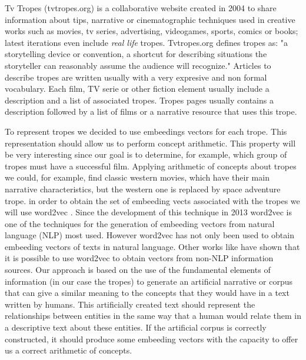 \documentclass[letterpaper]{article}
\begin{document}
Tv Tropes (tvtropes.org) is a collaborative website created in 2004 to
share information about tips, narrative or cinematographic techniques
used in creative works such as movies, tv series, advertising,
videogames, sports, comics or books; latest iterations even include
{\em real life} tropes.
Tvtropes.org defines tropes as:
"a storytelling device or convention, a shortcut for describing
situations the storyteller can reasonably assume the audience will
recognize." Articles to describe tropes are written usually with a very
expresive and non formal vocabulary. Each film, TV serie or other
fiction element usually include a description and a list of associated
tropes. Tropes pages usually contains a description followed by a list
of films or a narrative resource that uses this trope.

To represent tropes we decided to use embeedings vectors for each
trope. This representation should allow us to perform concept
arithmetic. This property will be very interesting since our goal is
to determine, for example, which group of tropes must have a
successful film. Applying arithmetic of concepts about tropes we
could, for example, find classic western movies, which have their main
narrative characteristics, but the western one is replaced by space
adventure trope. in order to obtain the set of embeeding vects
associated with the tropes we will use word2vec
\cite{mikolov2013}. Since the development of this technique in 2013
word2vec is one of the techniques for the generation of embeeding
vectors from natural language (NLP) most used. However word2vec has
not only been used to obtain embeeding vectors of texts in natural
language. Other works like \cite{kazama2018} have shown that it is
possible to use word2vec to obtain vectors from non-NLP information
sources. Our approach is based on the use of the fundamental elements
of information (in our case the tropes) to generate an artificial
narrative or corpus that can give a similar meaning to the concepts
that they would have in a text written by humans. This artificially
created text should represent the relationships between entities in
the same way that a human would relate them in a descriptive text
about these entities. If the artificial corpus is correctly
constructed, it should produce some embeeding vectors with the
capacity to offer us a correct arithmetic of concepts. 
	
\end{document}
